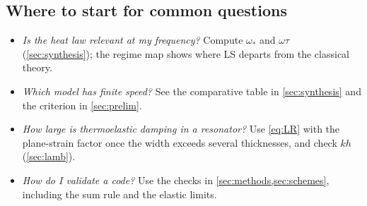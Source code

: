 \subsection{Where to start for common questions}
\begin{itemize}
\item \emph{Is the heat law relevant at my frequency?} Compute $\omega_*$ and $\omega\tau$ (\cref{sec:synthesis}); the regime map shows where LS departs from the classical theory.
\item \emph{Which model has finite speed?} See the comparative table in \cref{sec:synthesis} and the criterion in \cref{sec:prelim}.
\item \emph{How large is thermoelastic damping in a resonator?} Use \cref{eq:LR} with the plane-strain factor once the width exceeds several thicknesses, and check $kh$ (\cref{sec:lamb}).
\item \emph{How do I validate a code?} Use the checks in \cref{sec:methods,sec:schemes}, including the sum rule and the elastic limits.
\end{itemize}
